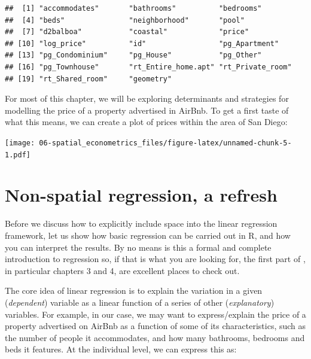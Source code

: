 \documentclass[
]{book}
\newenvironment{Shaded}{\begin{snugshade}}{\end{snugshade}}
\newcommand{\DataTypeTok}[1]{\textcolor[rgb]{0.13,0.29,0.53}{#1}}
\newcommand{\KeywordTok}[1]{\textcolor[rgb]{0.13,0.29,0.53}{\textbf{#1}}}
\newcommand{\NormalTok}[1]{#1}
\newcommand{\OperatorTok}[1]{\textcolor[rgb]{0.81,0.36,0.00}{\textbf{#1}}}
\newcommand{\StringTok}[1]{\textcolor[rgb]{0.31,0.60,0.02}{#1}}
\begin{document}
\begin{verbatim}
##  [1] "accommodates"       "bathrooms"          "bedrooms"          
##  [4] "beds"               "neighborhood"       "pool"              
##  [7] "d2balboa"           "coastal"            "price"             
## [10] "log_price"          "id"                 "pg_Apartment"      
## [13] "pg_Condominium"     "pg_House"           "pg_Other"          
## [16] "pg_Townhouse"       "rt_Entire_home.apt" "rt_Private_room"   
## [19] "rt_Shared_room"     "geometry"
\end{verbatim}

For most of this chapter, we will be exploring determinants and strategies for modelling the price of a property advertised in AirBnb. To get a first taste of what this means, we can create a plot of prices within the area of San Diego:

\begin{Shaded}
\end{Shaded}

\texttt{[image: 06-spatial\_econometrics\_files/figure-latex/unnamed-chunk-5-1.pdf]}

\hypertarget{non-spatial-regression-a-refresh}{%
\section{Non-spatial regression, a refresh}\label{non-spatial-regression-a-refresh}}

Before we discuss how to explicitly include space into the linear regression framework, let us show how basic regression can be carried out in R, and how you can interpret the results. By no means is this a formal and complete introduction to regression so, if that is what you are looking for, the first part of \citet{gelman2006data}, in particular chapters 3 and 4, are excellent places to check out.

The core idea of linear regression is to explain the variation in a given (\emph{dependent}) variable as a linear function of a series of other (\emph{explanatory}) variables. For example, in our case, we may want to express/explain the price of a property advertised on AirBnb as a function of some of its characteristics, such as the number of people it accommodates, and how many bathrooms, bedrooms and beds it features. At the individual level, we can express this as:
\end{document}
